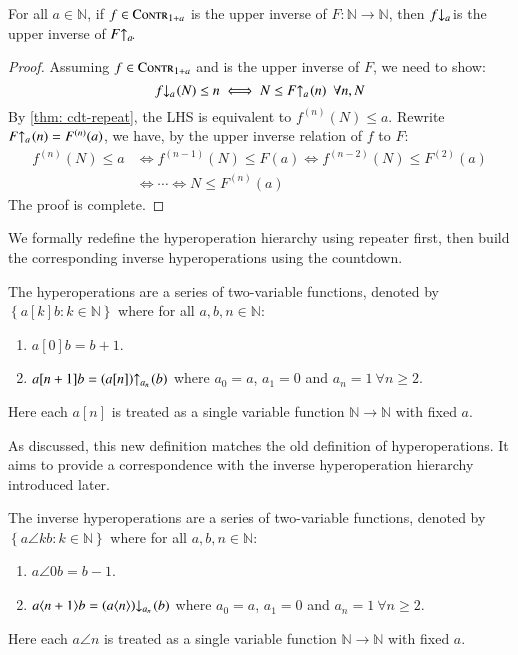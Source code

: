\begin{thm} \label{thm: upp-inv-cdt-rf}
For all $a\in \mathbb{N}$, if $f\in \text{\scshape{Contr}}_{1+a}$ is the upper inverse of $F: \mathbb{N}\to \mathbb{N}$, then $\cdt{f}{a}$ is the upper inverse of $\rf{F}{a}$.
\end{thm}
\begin{proof}
Assuming $f\in \text{\scshape{Contr}}_{1+a}$ and is the upper inverse of $F$, we need to show:
$$ \cdt{f}{a}(N) \le n \iff N \le \rf{F}{a}(n) \ \ \forall n, N $$
By \cref{thm: cdt-repeat}, the LHS is equivalent to $f^{(n)}(N)\le a$. Rewrite $\rf{F}{a}(n) = F^{(n)}(a)$, we have, by the upper inverse relation of $f$ to $F$:
$$ \begin{aligned}
f^{(n)}(N) \le a & \iff f^{(n-1)}(N) \le F(a) \iff f^{(n-2)}(N) \le F^{(2)}(a) \\
 & \iff \cdots \iff N \le F^{(n)}(a) 
\end{aligned}$$
The proof is complete.
\end{proof}

We formally redefine the hyperoperation hierarchy using repeater first, then build the corresponding inverse hyperoperations using the countdown.

\begin{defn}
The hyperoperations are a series of two-variable functions, denoted by $\left\{a[k]b : k\in \mathbb{N}\right\}$ where for all $a, b, n\in \mathbb{N}$:
\begin{enumerate}
	\item $a[0]b = b + 1$.
	\item $a[n+1]b = \rf{\left(a[n]\right)}{a_n}(b)$ where $a_0 = a$, $a_1 = 0$ and $a_n = 1 \ \forall n\ge 2$.
\end{enumerate}
Here each $a[n]$ is treated as a single variable function $\mathbb{N}\to \mathbb{N}$ with fixed $a$.
\end{defn}

As discussed, this new definition matches the old definition of hyperoperations. It aims to provide a correspondence with the inverse hyperoperation hierarchy introduced later.

\begin{defn}
The inverse hyperoperations are a series of two-variable functions, denoted by $\left\{a\angle{k}b : k\in \mathbb{N}\right\}$ where for all $a, b, n\in \mathbb{N}$:
\begin{enumerate}
	\item $a\angle{0}b = b - 1$.
	\item $a\angle{n+1}b = \cdt{\left(a\angle{n}\right)}{a_n}(b)$ where $a_0 = a$, $a_1 = 0$ and $a_n = 1 \ \forall n\ge 2$.
\end{enumerate}
Here each $a\angle{n}$ is treated as a single variable function $\mathbb{N}\to \mathbb{N}$ with fixed $a$.
\end{defn}

